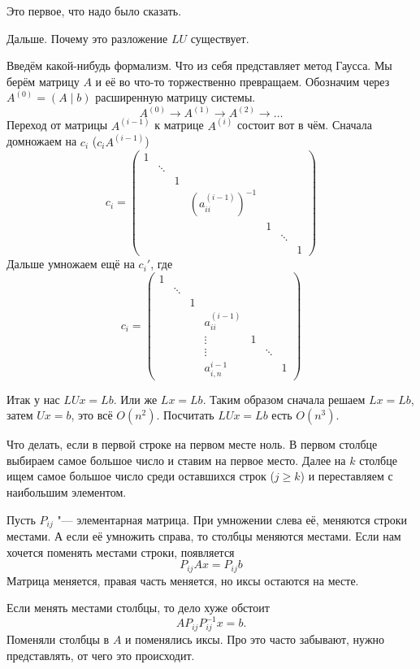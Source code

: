 Это первое, что надо было сказать.

Дальше. Почему это разложение $LU$ существует. 

Введём какой-нибудь формализм. Что из себя представляет метод Гаусса. Мы берём матрицу $A$ и её во что-то торжественно превращаем. Обозначим через $A^{(0)} = (A\mid b)$ расширенную матрицу системы.
\[
  A^{(0)} \to A^{(1)} \to A^{(2)}\to \dots
\]
Переход от матрицы $A^{(i-1)}$ к матрице $A^{(i)}$ состоит вот в чём. Сначала домножаем на $c_i$ ($c_i A^{(i-1)}$)
\[
  c_i = \begin{pmatrix}
  1 \\
  & \ddots \\
  & & 1\\
  & & & (a_{ii}^{(i-1)})^{-1}\\
  & & & & 1\\
  & & & & & \ddots\\
  & & & & & & 1
\end{pmatrix}
\]
Дальше умножаем ещё на $c_i'$, где
\[
  c_i = \begin{pmatrix}
  1 \\
  & \ddots \\
  & & 1\\
  & & & a_{ii}^{(i-1)}\\
  & & & \vdots & 1\\
  & & & \vdots & & \ddots\\
  & & &  a_{i,n}^{i-1}& & & 1
\end{pmatrix}
\]

Итак у нас $LU x = L b$. Или же $Lx = Lb$. Таким образом сначала решаем $Lx = Lb$, затем $Ux = b$, это всё $O(n^2)$. Посчитать $LUx = Lb$ есть $O(n^3)$.

Что делать, если в первой строке на первом месте ноль. В первом столбце выбираем самое большое число и ставим на первое место. Далее на $k$ столбце ищем самое большое число среди оставшихся строк ($j\ge k$) и переставляем с наибольшим элементом.

Пусть $P_{ij}$ "--- элементарная матрица. При умножении слева её, меняются строки местами. А если её умножить справа, то столбцы меняются местами.
Если нам хочется поменять местами строки, появляется
\[
  P_{ij} A x = P_{ij}b
\]
Матрица меняется, правая часть меняется, но иксы остаются на месте.

Если менять местами столбцы, то дело хуже обстоит
\[
  A P_{ij} P^{-1}_{ij} x =  b.
\]
Поменяли столбцы в $A$ и поменялись иксы. Про это часто забывают, нужно представлять, от чего это происходит.

